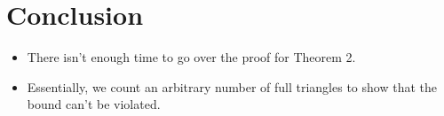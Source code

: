 \documentclass{beamer}
\theoremstyle{conjecture1}
\theoremstyle{conjecture2}
\begin{document}



\section{Conclusion}


\begin{frame}
    \begin{itemize}
        \item<1-> There isn't enough time to go over the proof for Theorem 2.
        \vspace{3mm}
        \item<2-> Essentially, we count an arbitrary number of full triangles to show that the 
        bound can't be violated.
    \end{itemize}
\end{frame}

\end{document}
